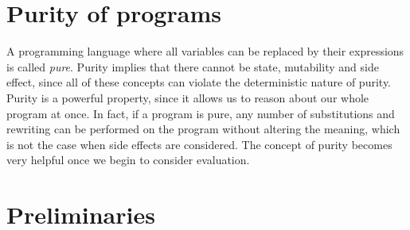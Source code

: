 
\section{Purity of programs}
A programming language where all variables can be replaced by their expressions is called \textit{pure}.
Purity implies that there cannot be state, mutability and side effect, since all of these concepts can violate the deterministic nature of purity.
Purity is a powerful property, since it allows us to reason about our whole program at once. 
In fact, if a program is pure, any number of substitutions and rewriting can be performed on the program without altering the meaning, which is not the case when side effects are considered.
The concept of purity becomes very helpful once we begin to consider evaluation.

\section{Preliminaries}




